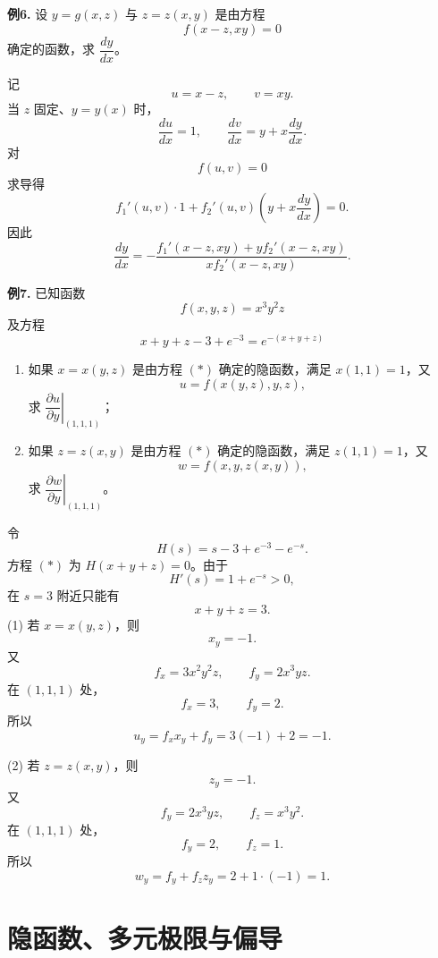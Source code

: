 \begin{problemblock}
\textbf{例6.} 设 \(y=g(x,z)\) 与 \(z=z(x,y)\) 是由方程
\[
f(x-z,xy)=0
\]
确定的函数，求 \(\dfrac{dy}{dx}\)。
\end{problemblock}
\begin{solutionblock}
记
\[
u=x-z,\qquad v=xy.
\]
当 \(z\) 固定、\(y=y(x)\) 时，
\[
\frac{du}{dx}=1,\qquad
\frac{dv}{dx}=y+x\frac{dy}{dx}.
\]
对
\[
f(u,v)=0
\]
求导得
\[
f_1'(u,v)\cdot1+f_2'(u,v)\left(y+x\frac{dy}{dx}\right)=0.
\]
因此
\[
\frac{dy}{dx}
=-\frac{f_1'(x-z,xy)+y f_2'(x-z,xy)}{x f_2'(x-z,xy)}.
\]
\end{solutionblock}

\begin{problemblock}
\textbf{例7.} 已知函数
\[
f(x,y,z)=x^3y^2z
\]
及方程
\[
x+y+z-3+e^{-3}=e^{-(x+y+z)}\tag{*}
\]
\begin{enumerate}[label=(\arabic*), leftmargin=2.2em]
\item 如果 \(x=x(y,z)\) 是由方程 \((*)\) 确定的隐函数，满足 \(x(1,1)=1\)，又
\[
u=f(x(y,z),y,z),
\]
求 \(\left.\dfrac{\partial u}{\partial y}\right|_{(1,1,1)}\)；
\item 如果 \(z=z(x,y)\) 是由方程 \((*)\) 确定的隐函数，满足 \(z(1,1)=1\)，又
\[
w=f(x,y,z(x,y)),
\]
求 \(\left.\dfrac{\partial w}{\partial y}\right|_{(1,1,1)}\)。
\end{enumerate}
\end{problemblock}
\begin{solutionblock}
令
\[
H(s)=s-3+e^{-3}-e^{-s}.
\]
方程 \((*)\) 为 \(H(x+y+z)=0\)。由于
\[
H'(s)=1+e^{-s}>0,
\]
在 \(s=3\) 附近只能有
\[
x+y+z=3.
\]
(1) 若 \(x=x(y,z)\)，则
\[
x_y=-1.
\]
又
\[
f_x=3x^2y^2z,\qquad f_y=2x^3yz.
\]
在 \((1,1,1)\) 处，
\[
f_x=3,\qquad f_y=2.
\]
所以
\[
u_y=f_xx_y+f_y=3(-1)+2=-1.
\]

(2) 若 \(z=z(x,y)\)，则
\[
z_y=-1.
\]
又
\[
f_y=2x^3yz,\qquad f_z=x^3y^2.
\]
在 \((1,1,1)\) 处，
\[
f_y=2,\qquad f_z=1.
\]
所以
\[
w_y=f_y+f_zz_y=2+1\cdot(-1)=1.
\]
\end{solutionblock}

\section{隐函数、多元极限与偏导}

